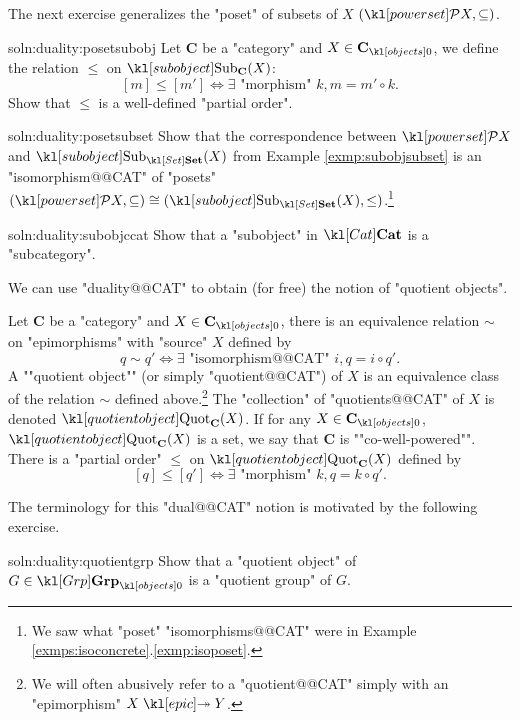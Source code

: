 \documentclass[main.tex]{subfiles}
\begin{document}
The next exercise generalizes the "poset" of subsets of $X$ $(\mP X, \subseteq)$.
\begin{exer}{soln:duality:posetsubobj}\label{exer:duality:posetsubobj}
	Let $\mathbf{C}$ be a "category" and $X \in \obj{\mathbf{C}}$, we define the relation $\leq$ on $\Sub_{\mathbf{C}}(X)$: 
	\[[m] \leq [m'] \Leftrightarrow \exists \text{ "morphism" } k,  m = m' \circ k.\]
	Show that $\leq$ is a well-defined "partial order".
\end{exer}
\begin{exer}{soln:duality:posetsubset}\label{exer:duality:posetsubset}
	Show that the correspondence between $\mP X$ and $\Sub_{\catSet}(X)$ from Example \ref{exmp:subobjsubset} is an "isomorphism@@CAT" of "posets" $(\mP X, \subseteq) \cong (\Sub_{\catSet}(X), \leq)$.\footnote{We saw what "poset" "isomorphisms@@CAT" were in Example \ref{exmps:isoconcrete}.\ref{exmp:isoposet}.}
\end{exer}
\begin{exer}{soln:duality:subobjccat}\label{exer:duality:subobjccat}
	Show that a "subobject" in $\catCat$ is a "subcategory".
\end{exer}
We can use "duality@@CAT" to obtain (for free) the notion of "quotient objects".
\begin{defn}[Quotients]
	Let $\mathbf{C}$ be a "category" and $X \in \obj{\mathbf{C}}$, there is an equivalence relation $\sim$ on "epimorphisms" with "source" $X$ defined by \[q \sim q' \Leftrightarrow \exists \text{ "isomorphism@@CAT" } i,  q = i \circ q'.\]
	\AP A ""quotient object"" (or simply "quotient@@CAT") of $X$ is an equivalence class of the relation $\sim$ defined above.\footnote{We will often abusively refer to a "quotient@@CAT" simply with an "epimorphism" $X \epi Y$.} The "collection" of "quotients@@CAT" of $X$ is denoted $\Quot_{\mathbf{C}}(X)$. \AP If for any $X \in \obj{\mathbf{C}}$, $\Quot_{\mathbf{C}}(X)$ is a set, we say that $\mathbf{C}$ is ""co-well-powered"". There is a "partial order" $\leq$ on $\Quot_{\mathbf{C}}(X)$ defined by 
	\[[q] \leq [q'] \Leftrightarrow \exists \text{ "morphism" } k,  q = k \circ q'.\]
\end{defn}
The terminology for this "dual@@CAT" notion is motivated by the following exercise.
\begin{exer}{soln:duality:quotientgrp}\label{exer:duality:quotientgrp}
	Show that a "quotient object" of $G \in \obj{\catGrp}$ is a "quotient group" of $G$.
\end{exer}
\end{document}
